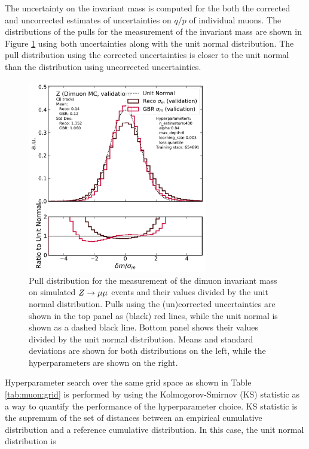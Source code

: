 The uncertainty on the invariant mass is computed for the both the corrected
and uncorrected estimates of uncertainties on $q/p$ of individual muons.
The distributions of the pulls for the measurement of the invariant mass
are shown in Figure \ref{fig:muon:std-dimuon} using both uncertainties
along with the unit normal distribution. The pull distribution using the
corrected uncertainties is closer to the unit normal than the distribution
using uncorrected uncertainties.
\begin{figure}[h!]
  \centering
  \includegraphics[width=0.7\textwidth]{figures/muons/vader-std-dimuon}
  \caption[VADER4$\mu$ uncertainty correction on the dimuon dataset]
  {Pull distribution for the measurement of the dimuon invariant mass
  on simulated $Z \rightarrow \mu\mu$ events and their values divided by the unit normal
  distribution. Pulls using the (un)corrected uncertainties are shown in 
  the top panel as (black) red lines, while the unit normal is shown as a
  dashed black line. Bottom panel shows their values divided by the
  unit normal distribution. Means and standard deviations are shown for
  both distributions on the left, while the hyperparameters are shown on
  the right.
  }
  \label{fig:muon:std-dimuon}
\end{figure}
Hyperparameter search over the same grid space as shown in Table
\ref{tab:muon:grid} is performed by using the Kolmogorov-Smirnov (KS)
statistic \cite{ks-test} as a way to quantify the performance of the
hyperparameter choice. KS statistic is the supremum of the set of
distances between an empirical cumulative distribution and a reference
cumulative distribution. In this case, the unit normal distribution is
